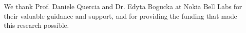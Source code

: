 \documentclass[sigconf, authorversion, nonacm, screen]{acmart}
\begin{document}

\begin{acks}
  We thank Prof. Daniele Quercia and Dr. Edyta Bogucka at Nokia Bell Labs for their valuable guidance and support, and for providing the funding that made this research possible.
\end{acks}




\appendix














\end{document}
